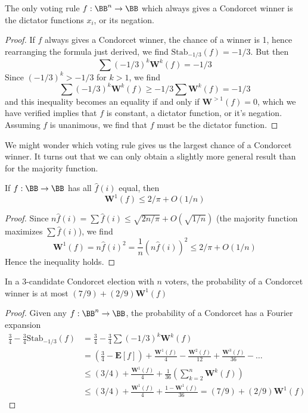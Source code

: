 \begin{theorem}[Kalai]
    The only voting rule $f: \BB^n \to \BB$ which always gives a Condorcet winner is the dictator functions $x_i$, or its negation.
\end{theorem}
\begin{proof}
    If $f$ always gives a Condorcet winner, the chance of a winner is 1, hence rearranging the formula just derived, we find $\text{Stab}_{-1/3}(f) = -1/3$. But then
    \[ \sum (-1/3)^k \mathbf{W}^k(f) = -1/3 \]
    Since $(-1/3)^k > -1/3$ for $k > 1$, we find
    \[ \sum (-1/3)^k \mathbf{W}^k(f) \geq -1/3 \sum \mathbf{W}^k(f) = -1/3 \]
    and this inequality becomes an equality if and only if $\mathbf{W}^{> 1}(f) = 0$, which we have verified implies that $f$ is constant, a dictator function, or it's negation. Assuming $f$ is unanimous, we find that $f$ must be the dictator function.
\end{proof}

We might wonder which voting rule gives us the largest chance of a Condorcet winner. It turns out that we can only obtain a slightly more general result than for the majority function.

\begin{lemma}
    If $f: \BB \to \BB$ has all $\widehat{f}(i)$ equal, then
    \[ \mathbf{W}^1(f) \leq 2/\pi + O(1/n) \]
\end{lemma}
\begin{proof}
    Since $n \widehat{f}(i) = \sum \widehat{f}(i) \leq \sqrt{2n/\pi} + O(\sqrt{1/n})$ (the majority function maximizes $\sum \widehat{f}(i)$), we find
    \[ \mathbf{W}^1(f) = n \widehat{f}(i)^2 = \frac{1}{n} (n \widehat{f}(i))^2 \leq 2/\pi + O(1/n) \]
    Hence the inequality holds.
\end{proof}

\begin{theorem}
    In a 3-candidate Condorcet election with $n$ voters, the probability of a Condorcet winner is at most $(7/9) + (2/9) \mathbf{W}^1(f)$
\end{theorem}
\begin{proof}
    Given any $f: \BB^n \to \BB$, the probability of a Condorcet has a Fourier expansion
    \begin{align*}
        \frac{3}{4} - \frac{3}{4} \text{Stab}_{-1/3}(f) &= \frac{3}{4} - \frac{3}{4} \sum (-1/3)^k \mathbf{W}^k(f)\\
        &= \left( \frac{3}{4} - \mathbf{E}[f] \right) + \frac{\mathbf{W}^1(f)}{4} - \frac{\mathbf{W}^2(f)}{12} + \frac{\mathbf{W}^3(f)}{36} - \dots\\
        &\leq (3/4) + \frac{\mathbf{W}^1(f)}{4} + \frac{1}{36} \left( \sum_{k = 2}^n \mathbf{W}^{k}(f) \right)\\
        &\leq (3/4) + \frac{\mathbf{W}^1(f)}{4} + \frac{1 - \mathbf{W}^1(f)}{36} = (7/9) + (2/9) \mathbf{W}^1(f)
    \end{align*}
\end{proof}

